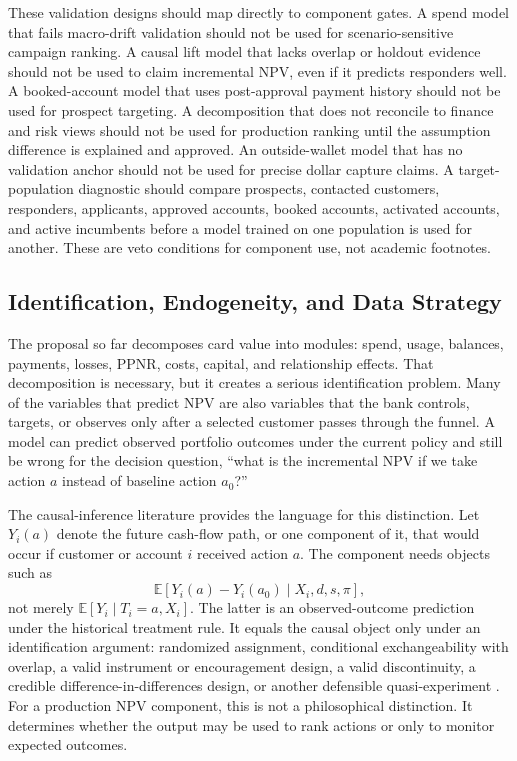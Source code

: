 \documentclass[11pt]{article}
\newcommand{\E}{\mathbb{E}}
\newcommand{\1}{\mathbf{1}}
\begin{document}
These validation designs should map directly to component gates. A spend model
that fails macro-drift validation should not be used for scenario-sensitive
campaign ranking. A causal lift model that lacks overlap or holdout evidence
should not be used to claim incremental NPV, even if it predicts responders
well. A booked-account model that uses post-approval payment history should not
be used for prospect targeting. A decomposition that does not reconcile to
finance and risk views should not be used for production ranking until the
assumption difference is explained and approved. An outside-wallet model that
has no validation anchor should not be used for precise dollar capture claims.
A target-population diagnostic should compare prospects, contacted customers,
responders, applicants, approved accounts, booked accounts, activated accounts,
and active incumbents before a model trained on one population is used for
another. These are veto conditions for component use, not academic footnotes.

\subsection{Identification, Endogeneity, and Data Strategy}
\label{sec:identification-data}

The proposal so far decomposes card value into modules: spend, usage,
balances, payments, losses, PPNR, costs, capital, and relationship effects.
That decomposition is necessary, but it creates a serious identification
problem. Many of the variables that predict NPV are also variables that the
bank controls, targets, or observes only after a selected customer passes
through the funnel. A model can predict observed portfolio outcomes under the
current policy and still be wrong for the decision question, ``what is the
incremental NPV if we take action $a$ instead of baseline action $a_0$?''

The causal-inference literature provides the language for this distinction.
Let $Y_i(a)$ denote the future cash-flow path, or one component of it, that
would occur if customer or account $i$ received action $a$. The component
needs objects such as
\begin{equation}
  \E\!\left[Y_i(a)-Y_i(a_0)\mid X_i, d, s, \pi\right],
  \label{eq:causal-cashflow-object}
\end{equation}
not merely $\E[Y_i\mid T_i=a,X_i]$. The latter is an observed-outcome
prediction under the historical treatment rule. It equals the causal object
only under an identification argument: randomized assignment, conditional
exchangeability with overlap, a valid instrument or encouragement design, a
valid discontinuity, a credible difference-in-differences design, or another
defensible quasi-experiment \citep{rosenbaum1983propensity,
imbensrubin2015causal,angrist2009mostlyharmless,imbenswooldridge2009recent,
hernanrobins2020causal}. For a production NPV component, this is not a
philosophical distinction. It determines whether the output may be used to
rank actions or only to monitor expected outcomes.
\end{document}
